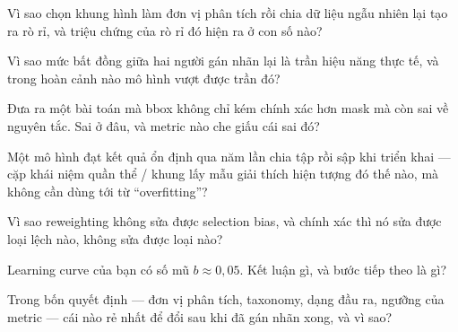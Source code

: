 \documentclass[../../deep_learning.tex]{subfiles}
\begin{document}
\begin{tukiem}
\item Vì sao chọn khung hình làm đơn vị phân tích rồi chia dữ liệu ngẫu nhiên lại tạo ra rò rỉ, và triệu chứng của rò rỉ đó hiện ra ở con số nào?
\item Vì sao mức bất đồng giữa hai người gán nhãn lại là trần hiệu năng thực tế, và trong hoàn cảnh nào mô hình vượt được trần đó?
\item Đưa ra một bài toán mà bbox không chỉ kém chính xác hơn mask mà còn sai về nguyên tắc. Sai ở đâu, và metric nào che giấu cái sai đó?
\item Một mô hình đạt kết quả ổn định qua năm lần chia tập rồi sập khi triển khai --- cặp khái niệm quần thể / khung lấy mẫu giải thích hiện tượng đó thế nào, mà không cần dùng tới từ ``overfitting''?
\item Vì sao reweighting không sửa được selection bias, và chính xác thì nó sửa được loại lệch nào, không sửa được loại nào?
\item Learning curve của bạn có số mũ \(b \approx 0{,}05\). Kết luận gì, và bước tiếp theo là gì?
\item Trong bốn quyết định --- đơn vị phân tích, taxonomy, dạng đầu ra, ngưỡng của metric --- cái nào rẻ nhất để đổi sau khi đã gán nhãn xong, và vì sao?
\end{tukiem}
\ifSubfilesClassLoaded{\printbibliography[title={Nguồn}]}{}
\end{document}
